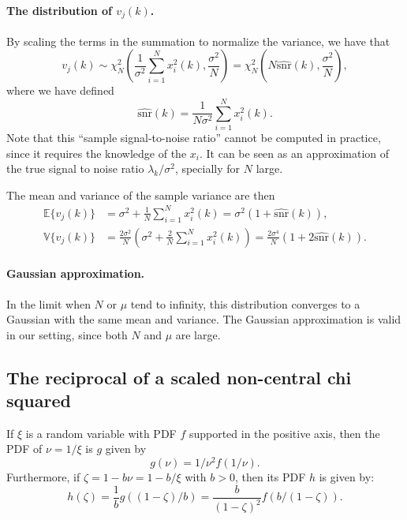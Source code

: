 \documentclass[a4paper,10pt]{article}
\begin{document}
\paragraph{The distribution of $v_j(k)$.}By scaling the terms in the summation
to normalize the variance, we have that 
\[v_j(k)\sim \chi^2_N\left(\frac1{\sigma^2}\sum_{i = 1}^Nx_i^2(k), \frac{\sigma^2}N\right) = \chi^2_N\left(N\hat{\text{snr}}(k), \frac{\sigma^2}N\right),\]
where we have defined 
\[\hat{\text{snr}}(k) = \frac1{N\sigma^2}\sum_{i = 1}^Nx_i^2(k).\]
Note that this ``sample signal-to-noise ratio'' cannot be computed in practice, since
it requires the knowledge of the $x_i$. It can be seen as an approximation of the
true signal to noise ratio $\lambda_k/\sigma^2$, specially for $N$ large.

The mean and variance of the sample variance are then
\begin{align*}
\mathbb E\{v_j(k)\} &= \sigma^2 + \frac1N\sum_{i = 1}^N x_i^2(k) =  \sigma^2(1 + \hat{\text{snr}}(k)),\\
\mathbb V\{v_j(k)\} &= \frac{2\sigma^2}N\left(\sigma^2 + \frac2N \sum_{i =1}^N x_i^2(k)\right) = \frac{2\sigma^4}N\left(1 + 2\hat{\text{snr}}(k)\right).
\end{align*}

\paragraph{Gaussian approximation.}In the limit when $N$ or $\mu$ tend to infinity, this distribution converges to
a Gaussian with the same mean and variance. The Gaussian approximation is valid in
our setting, since both $N$ and $\mu$ are large. 

\subsection{The reciprocal of a scaled non-central chi squared}

If $\xi$ is a random variable with PDF $f$ supported in the positive axis, then
the PDF of $\nu = 1/\xi$ is $g$ given by
\[g(\nu) = 1/{\nu^2}f(1/\nu).\]
Furthermore, if $\zeta = 1 - b\nu = 1 - b/\xi$ with $b>0$, then its PDF $h$ is
given by: 
\[h(\zeta) = \frac1b g((1 - \zeta)/b) = \frac b{(1-\zeta)^2}f(b/(1-\zeta) ).\]
\end{document}
